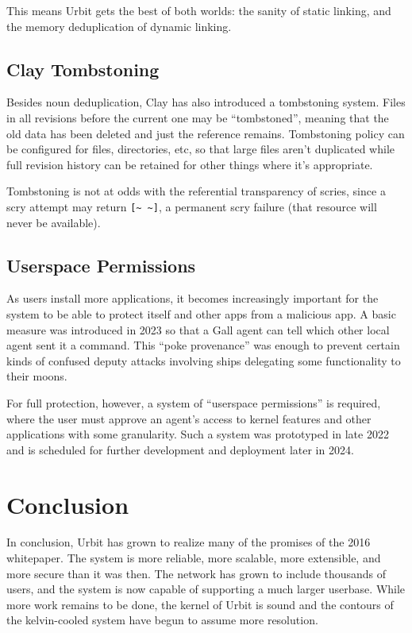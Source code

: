 \documentclass[twoside]{article}
\begin{document}
This means Urbit gets the best of both worlds: the sanity of static linking, and the memory deduplication of dynamic linking.

\subsection{Clay Tombstoning}

Besides noun deduplication, Clay has also introduced a tombstoning system.  Files in all revisions before the current one may be ``tombstoned'', meaning that the old data has been deleted and just the reference remains.  Tombstoning policy can be configured for files, directories, etc, so that large files aren't duplicated while full revision history can be retained for other things where it's appropriate.

Tombstoning is not at odds with the referential transparency of scries, since a scry attempt may return \lstinline[style=inlinecode]{[~ ~]}, a permanent scry failure (that resource will never be available).

\subsection{Userspace Permissions}

As users install more applications, it becomes increasingly important for the system to be able to protect itself and other apps from a malicious app.  A basic measure was introduced in 2023 so that a Gall agent can tell which other local agent sent it a command.  This ``poke provenance'' was enough to prevent certain kinds of confused deputy attacks involving ships delegating some functionality to their moons.

For full protection, however, a system of ``userspace permissions'' is required, where the user must approve an agent's access to kernel features and other applications with some granularity.  Such a system was prototyped in late 2022 and is scheduled for further development and deployment later in 2024.

\section{Conclusion}

In conclusion, Urbit has grown to realize many of the promises of the 2016 whitepaper.  The system is more reliable, more scalable, more extensible, and more secure than it was then.  The network has grown to include thousands of users, and the system is now capable of supporting a much larger userbase.  While more work remains to be done, the kernel of Urbit is sound and the contours of the kelvin-cooled system have begun to assume more resolution.  \tombstone{}
\end{document}
